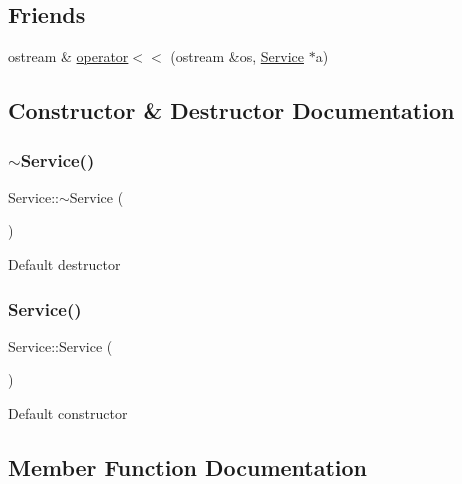 \subsection*{Friends}
\begin{DoxyCompactItemize}
\item 
ostream \& \hyperlink{class_service_a641fd7efe1dd35ea19ac062c4e2ece45}{operator$<$$<$} (ostream \&os, \hyperlink{class_service}{Service} $\ast$a)
\end{DoxyCompactItemize}


\subsection{Constructor \& Destructor Documentation}
\mbox{\label{class_service_af6c3577b59652ac817d1d76aaccee904}} 
\subsubsection{\texorpdfstring{$\sim$\+Service()}{~Service()}}
{\footnotesize\ttfamily Service\+::$\sim$\+Service (\begin{DoxyParamCaption}{ }\end{DoxyParamCaption})\hspace{0.3cm}{\ttfamily [virtual]}}

Default destructor \mbox{\label{class_service_acc246c9f7ed3c51e2d91d10fe257513f}} 
\subsubsection{\texorpdfstring{Service()}{Service()}}
{\footnotesize\ttfamily Service\+::\+Service (\begin{DoxyParamCaption}{ }\end{DoxyParamCaption})}

Default constructor 

\subsection{Member Function Documentation}
\mbox{\label{class_service_a9e1aa933d52a23d5e265666bdedea0f1}} 
